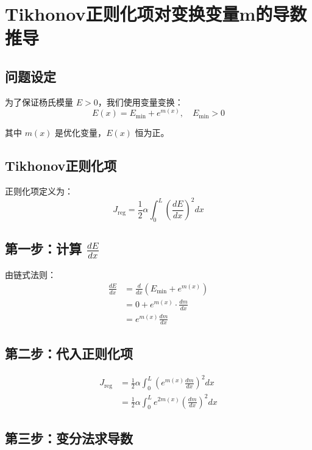 \documentclass{article}
\begin{document}
\section*{Tikhonov正则化项对变换变量m的导数推导}

\subsection*{问题设定}

为了保证杨氏模量 $E > 0$，我们使用变量变换：
\begin{equation}
E(x) = E_{\min} + e^{m(x)}, \quad E_{\min} > 0
\end{equation}

其中 $m(x)$ 是优化变量，$E(x)$ 恒为正。

\subsection*{Tikhonov正则化项}

正则化项定义为：
\begin{equation}
J_{\text{reg}} = \frac{1}{2} \alpha \int_0^L \left( \frac{dE}{dx} \right)^2 dx
\end{equation}

\subsection*{第一步：计算 $\frac{dE}{dx}$}

由链式法则：
\begin{align}
\frac{dE}{dx} &= \frac{d}{dx}\left( E_{\min} + e^{m(x)} \right) \\
&= 0 + e^{m(x)} \cdot \frac{dm}{dx} \\
&= e^{m(x)} \frac{dm}{dx}
\end{align}

\subsection*{第二步：代入正则化项}

\begin{align}
J_{\text{reg}} &= \frac{1}{2} \alpha \int_0^L \left( e^{m(x)} \frac{dm}{dx} \right)^2 dx \\
&= \frac{1}{2} \alpha \int_0^L e^{2m(x)} \left( \frac{dm}{dx} \right)^2 dx
\end{align}

\subsection*{第三步：变分法求导数}
\end{document}
